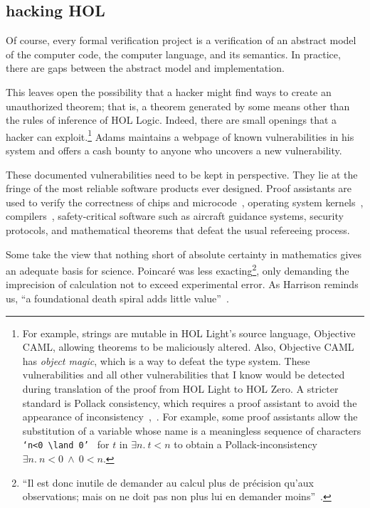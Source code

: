 \documentclass{llncs}
\begin{document}
\subsection{hacking HOL}

Of course, every formal verification project is a verification of an
abstract model of the computer code, the computer language, and its
semantics.  In practice, there are gaps between the abstract
model and implementation.

  
This leaves open the possibility that a hacker might find ways to
create an unauthorized theorem; that is, a theorem generated by some
means other than the rules of inference of HOL Logic.  Indeed, there
are small openings that a hacker can exploit.\footnote{For example,
  strings are mutable in HOL Light's source language, Objective CAML,
  allowing theorems to be maliciously altered.  Also, Objective CAML
  has {\it object magic}, which is a way to defeat the type system.
  These vulnerabilities and all other vulnerabilities that I know
  would be detected during translation of the proof from HOL Light to
  HOL Zero.  A stricter standard is Pollack consistency, which
  requires a proof assistant to avoid the appearance of
  inconsistency~\cite{Adams},~\cite{wiedijk:pollack}.  For example,
  some proof assistants allow the substitution of a variable
  whose name is a meaningless sequence of characters {\tt
    `n<0~$\land$~0' } for $t$ in $\exists n.~t<n$ to obtain a
  Pollack-inconsistency $\exists n.~{ {n<0~\land~0}}<n$.  } Adams maintains
a webpage of known vulnerabilities in his system and offers a cash
bounty to anyone who uncovers a new vulnerability.


These documented vulnerabilities need to be kept in perspective.  They
lie at the fringe of the most reliable software products ever
designed. Proof assistants are used to verify the correctness of chips
and microcode~\cite{FoxArm6}, operating system kernels~\cite{seL4}, 
compilers~\cite{CC}, safety-critical software such as aircraft
guidance systems, security protocols, and mathematical theorems that
defeat the usual refereeing process.  

Some take the view that nothing short of absolute certainty in
mathematics gives an adequate basis for science.  Poincar\'e was less
exacting\footnote{``Il est donc inutile de demander au calcul plus de
  pr\'ecision qu'aux observations; mais on ne doit pas non plus lui en
  demander moins''~\cite{HPMC}.},
only demanding the imprecision of calculation not to exceed
 experimental error.  As Harrison reminds us, 
``a foundational death spiral adds little value''~\cite{harrison-pm}.
\end{document}
